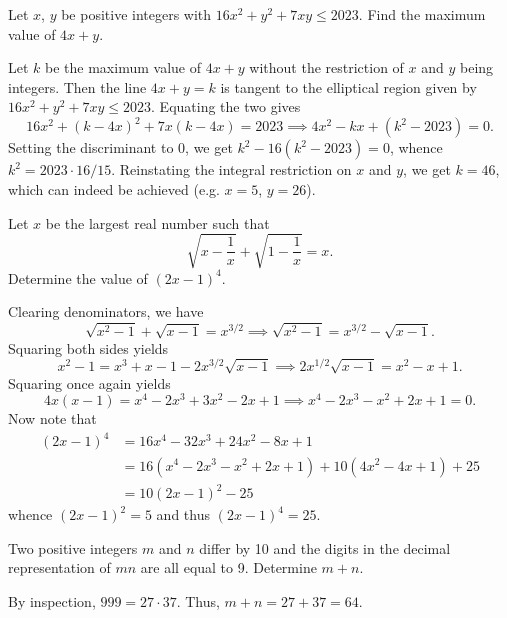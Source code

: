 \begin{question}[46]\label{Q::2023-O-1-15}
    Let $x$, $y$ be positive integers with $16x^2 + y^2 + 7xy \leq 2023$. Find the maximum value of $4x + y$.
\end{question}
\begin{solution*}
    Let $k$ be the maximum value of $4x + y$ without the restriction of $x$ and $y$ being integers. Then the line $4x + y = k$ is tangent to the elliptical region given by $16x^2 + y^2 + 7xy \leq 2023$. Equating the two gives \[16x^2 + (k-4x)^2 + 7x(k-4x) = 2023 \implies 4x^2 - kx + (k^2 - 2023) = 0.\] Setting the discriminant to 0, we get $k^2 - 16(k^2 - 2023) = 0$, whence $k^2 = 2023 \cdot 16 / 15$. Reinstating the integral restriction on $x$ and $y$, we get $k = 46$, which can indeed be achieved (e.g. $x = 5$, $y = 26$).
\end{solution*}

\begin{question}[25]\label{Q::2023-O-1-16}
    Let $x$ be the largest real number such that \[\sqrt{x - \dfrac1x} + \sqrt{1 - \dfrac1x} = x.\] Determine the value of $(2x-1)^4$.
\end{question}
\begin{solution*}
    Clearing denominators, we have \[\sqrt{x^2 - 1} + \sqrt{x - 1} = x^{3/2} \implies \sqrt{x^2 - 1} = x^{3/2} - \sqrt{x-1}.\] Squaring both sides yields \[x^2 - 1 = x^3 + x - 1 - 2x^{3/2}\sqrt{x-1} \implies 2x^{1/2}\sqrt{x-1} = x^2 - x + 1.\] Squaring once again yields \[4x(x-1) = x^4 - 2x^3 + 3x^2 - 2x + 1 \implies x^4 - 2x^3 - x^2 + 2x + 1 = 0.\] Now note that \begin{align*}
        (2x-1)^4 &= 16x^4 - 32 x^3 + 24x^2 - 8x + 1\\
        &= 16(x^4 - 2x^3 -x^2 + 2x + 1) + 10(4x^2 - 4x + 1) + 25\\
        &= 10(2x-1)^2 - 25
    \end{align*}
    whence $(2x-1)^2 = 5$ and thus $(2x-1)^4 = 25$.
\end{solution*}
   
\begin{question}[64]\label{Q::2023-O-1-17}
    Two positive integers $m$ and $n$ differ by 10 and the digits in the decimal representation of $mn$ are all equal to 9. Determine $m + n$.
\end{question}
\begin{solution*}
    By inspection, $999 = 27 \cdot 37$. Thus, $m + n = 27 + 37 = 64$.
\end{solution*}
    
